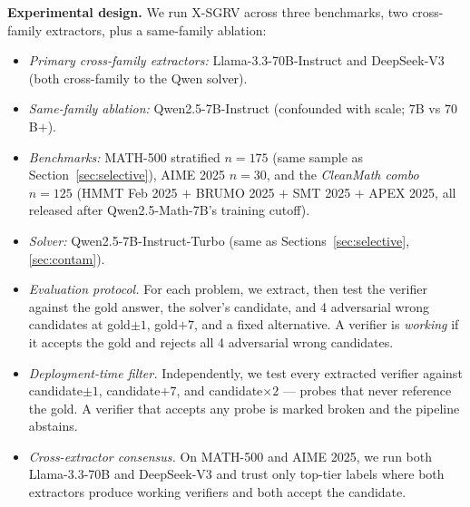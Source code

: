 \documentclass{article}
\begin{document}
\textbf{Experimental design.} We run X-SGRV across three benchmarks, two cross-family extractors, plus a same-family ablation:
\begin{itemize}[leftmargin=*,itemsep=1pt]
\item \emph{Primary cross-family extractors:} Llama-3.3-70B-Instruct and DeepSeek-V3 (both cross-family to the Qwen solver).
\item \emph{Same-family ablation:} Qwen2.5-7B-Instruct (confounded with scale; $7$B vs $70$B$+$).
\item \emph{Benchmarks:} MATH-500 stratified $n{=}175$ (same sample as Section~\ref{sec:selective}), AIME 2025 $n{=}30$, and the \emph{CleanMath combo} $n{=}125$ (HMMT Feb 2025 $+$ BRUMO 2025 $+$ SMT 2025 $+$ APEX 2025, all released after Qwen2.5-Math-7B's training cutoff).
\item \emph{Solver:} Qwen2.5-7B-Instruct-Turbo (same as Sections~\ref{sec:selective}, \ref{sec:contam}).
\item \emph{Evaluation protocol.} For each problem, we extract, then test the verifier against the gold answer, the solver's candidate, and 4 adversarial wrong candidates at gold$\pm 1$, gold$+ 7$, and a fixed alternative. A verifier is \emph{working} if it accepts the gold and rejects all 4 adversarial wrong candidates.
\item \emph{Deployment-time filter.} Independently, we test every extracted verifier against candidate$\pm 1$, candidate$+ 7$, and candidate$\times 2$ --- probes that never reference the gold. A verifier that accepts any probe is marked broken and the pipeline abstains.
\item \emph{Cross-extractor consensus.} On MATH-500 and AIME 2025, we run both Llama-3.3-70B and DeepSeek-V3 and trust only top-tier labels where both extractors produce working verifiers and both accept the candidate.
\end{itemize}
\end{document}
